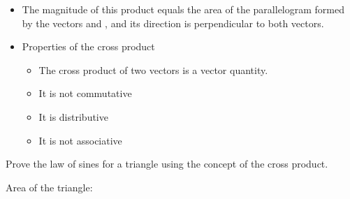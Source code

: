 \begin{ELdefinition}{}


\end{ELdefinition}

\begin{ELunit}

\begin{itemize}
\tightlist
\item
  The magnitude of this product equals the area of the parallelogram formed by the vectors  and , and its direction is perpendicular to both vectors.
\end{itemize}


\end{ELunit}

\begin{ELjoin}

\begin{itemize}
\tightlist
\item
  Properties of the cross product

  \begin{itemize}
  \item
    The cross product of two vectors is a vector quantity.
  \item
    It is not commutative
  \item
    It is distributive
  \item
    It is not associative
  \end{itemize}
\end{itemize}


\begin{ELexample}{}

Prove the law of sines for a triangle using the concept of the cross product.


\begin{ELsolution}

Area of the triangle:

\end{ELsolution}

\end{ELexample}

\end{ELjoin}

